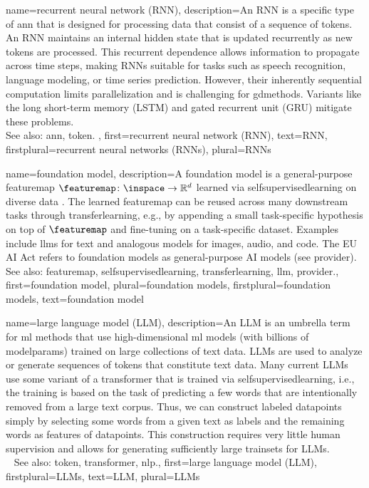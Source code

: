 {name={recurrent neural network (RNN)},
	description={An RNN 
		is a specific type of \gls{ann} that is designed for processing 
		\gls{data} that consist of a \gls{sequence} of \glspl{token}. 
		An RNN maintains an internal hidden \gls{state} that is updated recurrently 
		as new \glspl{token} are processed. This recurrent dependence allows 
		information to propagate across time steps, making RNNs suitable for 
		tasks such as speech recognition, language modeling, or time series \gls{prediction}. 
    		However, their inherently sequential computation limits parallelization and 
		is challenging for \glspl{gdmethod}. Variants like the long short-term memory (LSTM) 
		and gated recurrent unit (GRU) mitigate these problems.
		\\
		See also: \gls{ann}, \gls{token}. }, 
 	first={recurrent neural network (RNN)},
 	text={RNN},
 	firstplural={recurrent neural networks (RNNs)}, 
 	plural={RNNs}
}

{name={foundation model},
	description={A foundation \gls{model} is a general-purpose
		\gls{featuremap} $\featuremap \colon \inspace \to \mathbb{R}^{d}$ learned via
		\gls{selfsupervisedlearning} on diverse \gls{data} \cite{Bommasani2021}.
		The learned \gls{featuremap} can be reused across many downstream tasks
		through \gls{transferlearning}, e.g., by appending a small task-specific
		\gls{hypothesis} on top of $\featuremap$ and fine-tuning on a
		task-specific \gls{dataset}.
		Examples include \glspl{llm} for text and analogous \glspl{model}
		for images, audio, and code.
		The EU AI Act refers to foundation \glspl{model} as general-purpose
		AI \glspl{model} \cite{EUAIAct2024} (see \gls{provider}).
		\\
		See also: \gls{featuremap}, \gls{selfsupervisedlearning}, \gls{transferlearning}, 
		\gls{llm}, \gls{provider}.},
	first={foundation model},
	plural={foundation models},
	firstplural={foundation models},
	text={foundation model}
}

{name={large language model (LLM)},
	description={An LLM is an umbrella term for \gls{ml} 
		methods that use high-dimensional \gls{ml} \glspl{model} (with billions 
		of \glspl{modelparam}) trained on large collections of text \gls{data}. 
 		LLMs are used to analyze or generate \glspl{sequence} of \glspl{token} that 
               	constitute text \gls{data}. Many current LLMs use some variant of 
		a \gls{transformer} that is trained via \gls{selfsupervisedlearning}, i.e.,
		the \gls{training} is based on the task of predicting a few words that 
		are intentionally removed from a large text corpus. Thus, we can 
		construct \glspl{labeled datapoint} simply by selecting some words 
		from a given text as \glspl{label} and the remaining words as \glspl{feature} 
		of \glspl{datapoint}. This construction requires 
		very little human supervision and allows for generating sufficiently 
		large \glspl{trainset} for LLMs.
		\\ 
		See also: \gls{token}, \gls{transformer}, \gls{nlp}.}, 
  	first={large language model (LLM)}, 
  	firstplural={LLMs}, 
  	text={LLM}, 
  	plural={LLMs} 
}

